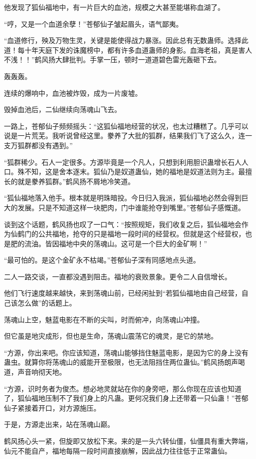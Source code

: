 \begin{this_body}
他发现了狐仙福地中，有一片巨大的血池，规模之大甚至能堪称血湖了。

“哼，又是一个血道余孽！”苍郁仙子皱起眉头，语气鄙夷。

“血道修行，殃及万物生灵，关键是能使得战力暴涨。因此总有无数蛊师。选择此道！每十年天庭下发的诛魔榜中，都有许多血道蛊师的身影。血海老祖，真是害人不浅！！”鹤风扬大肆批判。手掌一压，顿时一道道碧色雷光轰砸下去。

轰轰轰。

连续的爆响中，血池被炸毁，成为一片废墟。

毁掉血池后，二仙继续向荡魂山飞去。

一路上，苍郁仙子频频摇头：“这狐仙福地经营的状况，也太过糟糕了。几乎可以说是一片荒芜。我听说曾经这里。豢养了大批的狐群，结果我们飞了这么久，连一支万狐群都没有遇到。”

“狐群稀少。石人一定很多。方源毕竟是一个凡人，只想到利用胆识蛊增长石人人口。殊不知，这是舍本逐末。狐仙乃是奴道蛊仙，她的福地是奴道法则为主。最擅长的就是豢养狐群。”鹤风扬不屑地冷笑道。

“狐仙福地落入他手。根本就是明珠暗投。今日归入我派，狐仙福地必然会得到巨大的发展。只是不知道这样一块肥肉，门中谁能抢夺到嘴里。”苍郁仙子感慨道。

谈到这个话题，鹤风扬也叹了一口气：“按照规矩，我们收复之后，狐仙福地会作为仙鹤门的公共福地，抢夺的只是福地一段时间的经营权。但就是这个经营权，也是肥的流油。皆因福地中央的荡魂山。这可是一个巨大的金矿啊！”

“最可怕的。是这个金矿永不枯竭。”苍郁仙子深有同感地点头道。

二人一路交谈，一直都没遇到阻击。福地的衰败景象。更令二人自信增长。

他们飞行速度越来越快，来到荡魂山前，已经闲扯到“若狐仙福地由自己经营，自己该怎么做”的话题上。

荡魂山上空，魅蓝电影在不断的尖叫，时而俯冲，向荡魂山冲撞。

但它虽是地灾成形，但也是生命，荡魂山震荡它的魂灵，是它的禁地。

“方源，你出来吧。你应该知道，荡魂山能够挡住魅蓝电影，是因为它的身上没有蛊虫。就算你将荡魂山的威能开至极限，也无法阻挡住两位蛊仙。”鹤风扬朗声喝道，声音响彻天地。

“方源，识时务者为俊杰。想必地灵就站在你的身旁吧，那么你现在应该也知道了，狐仙福地压制不了我们身上的凡蛊。更何况我们身上还带着一只仙蛊！”苍郁仙子紧接着开口，对方源施压。

于是，方源走出来，站在荡魂山巅。

鹤风扬心头一紧，但旋即又放松下来。来的是一头六转仙僵，仙僵具有重大弊端，仙元不能自产，福地每隔一段时间直接崩解，因此战力往往低于正常蛊仙。


\end{this_body}
